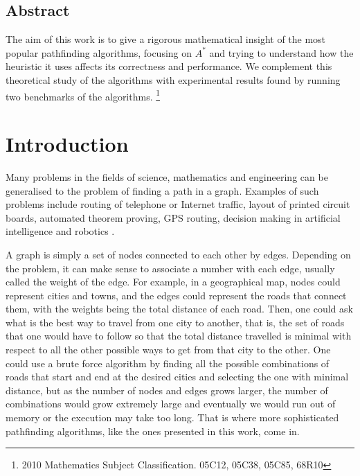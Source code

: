 \documentclass[a4paper,10pt]{report}
\begin{document}
\section*{Abstract}
The aim of this work is to give a rigorous mathematical insight of the most popular pathfinding algorithms, focusing on $A^*$ and trying to understand how the heuristic it uses affects its correctness and performance. We complement this theoretical study of the algorithms with experimental results found by running two benchmarks of the algorithms.
{\let\thefootnote\relax\footnote{2010 Mathematics Subject Classification. 05C12, 05C38, 05C85, 68R10}}


\tableofcontents

\pagestyle{fancy}
\chapter{Introduction}
Many problems in the fields of science, mathematics and engineering can be generalised to the problem of finding a path in a graph. Examples of such problems include routing of telephone or Internet traffic, layout of printed circuit boards, automated theorem proving, GPS routing, decision making in artificial intelligence and robotics \cite{ai}.

A graph is simply a set of nodes connected to each other by edges. Depending on the problem, it can make sense to associate a number with each edge, usually called the weight of the edge. For example, in a geographical map, nodes could represent cities and towns, and the edges could represent the roads that connect them, with the weights being the total distance of each road. Then, one could ask what is the best way to travel from one city to another, that is, the set of roads that one would have to follow so that the total distance travelled is minimal with respect to all the other possible ways to get from that city to the other. One could use a brute force algorithm by finding all the possible combinations of roads that start and end at the desired cities and selecting the one with minimal distance, but as the number of nodes and edges grows larger, the number of combinations would grow extremely large and eventually we would run out of memory or the execution may take too long. That is where more sophisticated pathfinding algorithms, like the ones presented in this work, come in.
\end{document}
